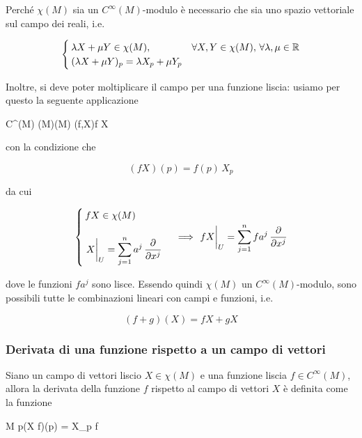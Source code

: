 Perché $ \chi(M) $ sia un $ C^{\infty}(M) $-modulo è necessario che sia uno spazio vettoriale sul campo dei reali, i.e.

\begin{equation}
	\begin{cases}
		\lambda X + \mu Y \in \chi(M), & \forall X,Y \in \chi(M), \, \forall \lambda,\mu \in \mathbb{R}\\
		(\lambda X + \mu Y)_{p} = \lambda X_{p} + \mu Y_{p}
	\end{cases}
\end{equation}

Inoltre, si deve poter moltiplicare il campo per una funzione liscia: usiamo per questo la seguente applicazione

	{C^{\infty}(M) \times \chi(M)}{\chi(M)}
	{(f,X)}{f X}

con la condizione che

\begin{equation}
	(f X)(p) = f(p) \, X_{p}
\end{equation}

da cui

\begin{equation}
	\begin{cases}
		f X \in \chi(M) \\\\
		\displaystyle \eval{X}_{U} = \sum_{j=1}^{n} a^{j} \, \pdv{x^{j}}
	\end{cases} %
	\implies %
	\eval{f X}_{U} = \sum_{j=1}^{n} f a^{j} \, \pdv{x^{j}}
\end{equation}

dove le funzioni $ f a^{j} $ sono lisce. Essendo quindi $ \chi(M) $ un $ C^{\infty}(M) $-modulo, sono possibili tutte le combinazioni lineari con campi e funzioni, i.e.

\begin{equation}
	(f+g)(X) = f X + g X
\end{equation}

\subsubsection{Derivata di una funzione rispetto a un campo di vettori}

Siano un campo di vettori liscio $ X \in \chi(M) $ e una funzione liscia $ f \in C^{\infty}(M) $, allora la derivata della funzione $ f $ rispetto al campo di vettori $ X $ è definita come la funzione

	{M}{\R}
	{p}{(X f)(p) = X_{p} f}


